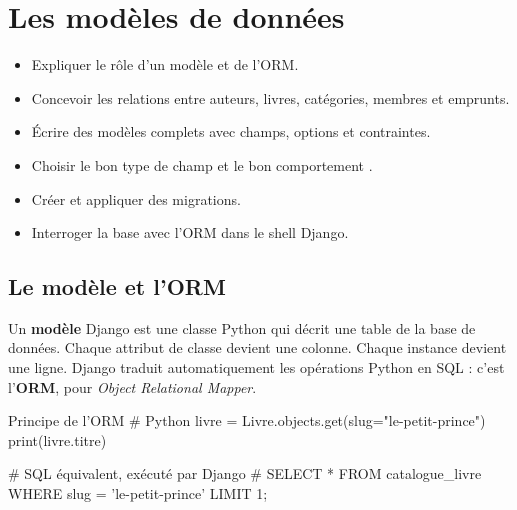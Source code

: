 \chapter{Les modèles de données}
\label{ch:modeles}


\begin{objectifs}
\begin{itemize}
  \item Expliquer le rôle d'un modèle et de l'ORM.
  \item Concevoir les relations entre auteurs, livres, catégories, membres et
        emprunts.
  \item Écrire des modèles complets avec champs, options et contraintes.
  \item Choisir le bon type de champ et le bon comportement .
  \item Créer et appliquer des migrations.
  \item Interroger la base avec l'ORM dans le shell Django.
\end{itemize}
\end{objectifs}

\section{Le modèle et l'ORM}

Un \textbf{modèle} Django est une classe Python qui décrit une table de la base de
données. Chaque attribut de classe devient une colonne. Chaque instance devient une
ligne. Django traduit automatiquement les opérations Python en SQL : c'est
l'\textbf{ORM}, pour \emph{Object Relational Mapper}.

\begin{codebox}[python]{Principe de l'ORM}
# Python
livre = Livre.objects.get(slug="le-petit-prince")
print(livre.titre)

# SQL équivalent, exécuté par Django
# SELECT * FROM catalogue_livre WHERE slug = 'le-petit-prince' LIMIT 1;
\end{codebox}

